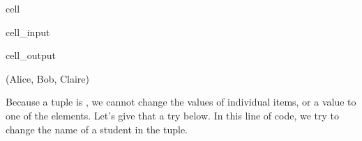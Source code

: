 \documentclass[letterpaper,10pt,english]{jupyterBook}
\begin{document}
\begin{sphinxuseclass}{cell}\begin{sphinxVerbatimInput}

\begin{sphinxuseclass}{cell_input}
\begin{sphinxVerbatim}[commandchars=\\\{\}]
\end{sphinxVerbatim}

\end{sphinxuseclass}\end{sphinxVerbatimInput}
\begin{sphinxVerbatimOutput}

\begin{sphinxuseclass}{cell_output}
\begin{sphinxVerbatim}[commandchars=\\\{\}]
(\PYGZsq{}Alice\PYGZsq{}, \PYGZsq{}Bob\PYGZsq{}, \PYGZsq{}Claire\PYGZsq{})
\end{sphinxVerbatim}

\end{sphinxuseclass}\end{sphinxVerbatimOutput}

\end{sphinxuseclass}
\sphinxAtStartPar
Because a tuple is , we cannot change the values of individual items, or  a value to one of the elements. Let’s give that a try below. In this line of code, we try to change the name of a student in the tuple.
\end{document}
